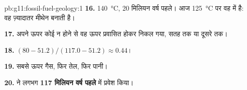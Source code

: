 \begin{solution}{pb:g11:fossil-fuel-geology:1}
\textbf{16.} \qty{140}{\degreeCelsius}, 20 मिलियन वर्ष पहले। आज
\qty{125}{\degreeCelsius} पर वह  में है: वह ज़्यादातर
मीथेन बनाती है।

\textbf{17.} अपने ऊपर कोई  न होने से वह ऊपर प्रवासित होकर निकल गया,
सतह तक या दूसरे  तक।

\textbf{18.} $(80 - 51.2)/(117.0 - 51.2) \approx 0.44$।

\textbf{19.} सबसे ऊपर गैस, फिर तेल, फिर पानी।

\textbf{20.}  ने लगभग \textbf{117
मिलियन वर्ष पहले}  में प्रवेश किया।
\end{solution}
